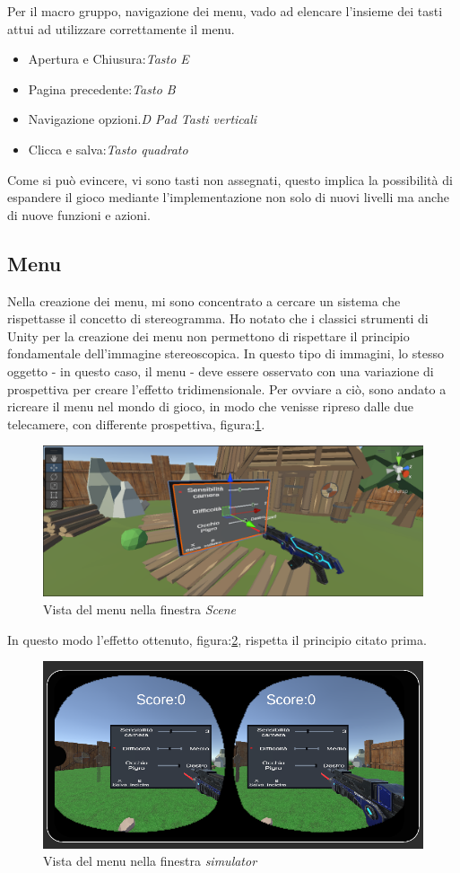 \documentclass[
a4paper,
cleardoublepage=empty,
headings=twolinechapter,
numbers=autoenddot,
]{scrbook}
\begin{document}
	Per il macro gruppo, navigazione dei menu, vado ad elencare l'insieme dei tasti attui ad utilizzare correttamente il menu.
	\begin{itemize}
		\item Apertura e Chiusura:\textit{Tasto E}
		\item Pagina precedente:\textit{Tasto B}
		\item Navigazione opzioni.\textit{D Pad Tasti verticali}
		\item Clicca e salva:\textit{Tasto quadrato}
	\end{itemize}
	Come si può evincere, vi sono tasti non assegnati, questo implica la possibilità di espandere il gioco mediante l'implementazione non solo di nuovi livelli ma anche di nuove funzioni e azioni.
	\subsection{Menu}
	Nella creazione dei menu, mi sono concentrato a cercare un sistema che rispettasse il concetto di stereogramma\cite{Stereogramma}. Ho notato che i classici strumenti di Unity per la creazione dei menu non permettono di rispettare il principio fondamentale dell'immagine stereoscopica. In questo tipo di immagini, lo stesso oggetto - in questo caso, il menu - deve essere osservato con una variazione di prospettiva per creare l'effetto tridimensionale.
	Per ovviare a ciò, sono andato a ricreare il menu nel mondo di gioco, in modo che venisse ripreso dalle due telecamere, con differente prospettiva, figura:\ref{fig:menu_scena}.
	\begin{figure}[h]
		\centering
		\includegraphics[width=0.6\linewidth]{image/menu_scena}
		\caption{Vista del menu nella finestra \textit{Scene}}
		\label{fig:menu_scena}
	\end{figure}
	In questo modo l'effetto ottenuto, figura:\ref{fig:menu_simulator}, rispetta il principio citato prima.
	\begin{figure}[h]
		\centering
		\includegraphics[width=0.6\linewidth]{image/menu_simulatore}
		\caption{Vista del menu nella finestra \textit{simulator}}
		\label{fig:menu_simulator}
	\end{figure}
\end{document}
